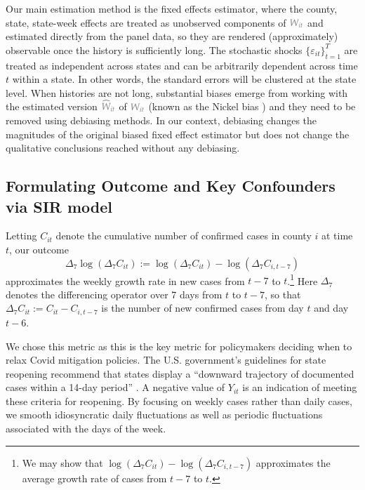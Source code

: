 \documentclass[9pt,twoside,lineno]{pnas-new}
\theoremstyle{definition}
\def\wcolor{\color{gray}}
\begin{document}
Our main estimation method is the fixed effects estimator, where the county, state, state-week effects are treated as 
unobserved components of ${\wcolor W_{it}}$ and estimated directly from the panel data, so they are rendered 
(approximately) observable once the history is sufficiently long. The stochastic shocks $\{ \varepsilon_{it}\}_{t=1}^T$
are treated as independent across states and can be arbitrarily dependent across time $t$ within a state.  In other words, the standard errors will be clustered at the state level.    When histories are not long,  substantial biases emerge 
from working with the estimated version ${\wcolor \widehat W_{it}}$ of ${\wcolor W_{it}}$  (known as the Nickel bias \citep{Nickell1981}) and they need to be removed using debiasing methods. In our context, debiasing changes  the magnitudes of the original biased fixed effect estimator but does not change the qualitative conclusions reached without any debiasing. 

\subsection*{Formulating Outcome and Key Confounders via SIR model}\label{sec:sirmodel}
Letting $C_{it}$ denote the cumulative number of  confirmed cases in county $i$ at time $t$, our outcome
\begin{equation} \label{eq:y}
 \Delta_7 \log(\Delta_7 C_{it}):= \log( \Delta_7 C_{it} ) -
\log( \Delta_7 C_{i,t-7})
\end{equation}
approximates the weekly growth rate in new cases from $t-7$ to $t$.\footnote{We may show that $ \log( \Delta_7 C_{it} ) -
\log( \Delta_7 C_{i,t-7})$ approximates the average
growth rate of cases from $t-7$ to $t$.} Here $\Delta_7$ denotes the differencing operator over 7 days from $t$ to $t-7$, so that $\Delta_7 C_{it}:=C_{it}-C_{i,t-7}$ is the number of new confirmed cases from day $t$ and day $t-6$.


We chose this metric as this is the key metric for policymakers deciding when to relax Covid mitigation policies.  The U.S. government's guidelines for state reopening
recommend that states display a
``downward trajectory of documented cases within a 14-day period''
\citep{whitehouse2020}. A negative value of
$Y_{it}$ is an indication of meeting these criteria for reopening. By focusing on weekly cases rather than daily cases, we smooth idiosyncratic daily fluctuations as well as periodic fluctuations associated with the days of the week.
\end{document}
